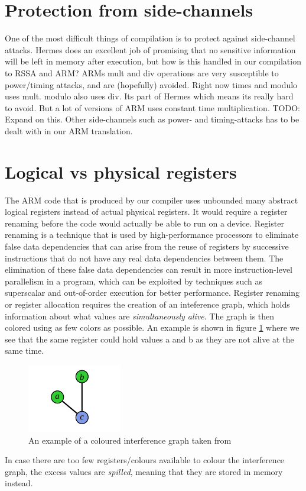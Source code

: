 \section{Protection from side-channels}
One of the most difficult things of compilation is to protect against side-channel attacks. Hermes does an excellent job of promising that no sensitive information will be left in memory after execution, but how is this handled in our compilation to RSSA and ARM?
ARMs mult and div operations are very susceptible to power/timing attacks, and are (hopefully) avoided. Right now times and modulo uses mult. modulo also uses div. Its part of Hermes which means its really hard to avoid. But a lot of versions of ARM uses constant time multiplication. TODO: Expand on this.
Other side-channels such as power- and timing-attacks has to be dealt with in our ARM translation. %


\section{Logical vs physical registers}
The ARM code that is produced by our compiler uses unbounded many abstract logical registers instead of actual physical registers.
It would require a register renaming before the code would actually be able to run on a device.
Register renaming is a technique that is used by high-performance processors to eliminate false data dependencies that can arise from the reuse of registers by successive instructions that do not have any real data dependencies between them.
The elimination of these false data dependencies can result in more instruction-level parallelism in a program, which can be exploited by techniques such as superscalar and out-of-order execution for better performance.
Register renaming or register allocation requires the creation of an inteference graph, which holds information about what values are \emph{simultaneously alive}. The graph is then colored using as few colors as possible. An example is shown in figure \ref{fig:interferencegraph} where we see that the same register could hold values a and b as they are not alive at the same time.

\begin{figure}[ht]
  \centering
  \includegraphics[scale=0.5]{Graphics/interferencegraph.png}
  \caption{An example of a coloured interference graph taken from \cite{ITU_liveness} }
  \label{fig:interferencegraph}
\end{figure}

In case there are too few registers/colours available to colour the interference graph, the excess values are \emph{spilled}, meaning that they are stored in memory instead.
